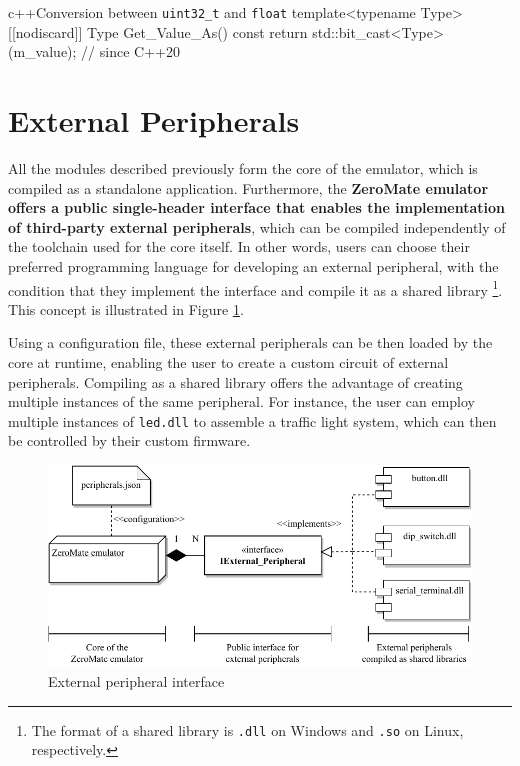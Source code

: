 \documentclass[english, ing, kiv, he, iso690numb, pdf]{fasthesis}
\begin{document}
\begin{code}{c++}{Conversion between \texttt{uint32\_t} and \texttt{float}\label{Conversion between uint32_t and float}}
template<typename Type>
[[nodiscard]] Type Get_Value_As() const
{
	return std::bit_cast<Type>(m_value); // since C++20
}
\end{code}
	
	\newpage
	
	\section{External Peripherals} \label{External 
		Peripherals}
	
	All the modules described previously form the core of the emulator, which is compiled as a standalone application. Furthermore, the \textbf{ZeroMate emulator offers a public single-header interface that enables the implementation of third-party external peripherals}, which can be compiled independently of the toolchain used for the core itself. In other words, users can choose their preferred programming language for developing an external peripheral, with the condition that they implement the interface and compile it as a shared library \footnote{The format of a shared library is \texttt{.dll} on Windows and \texttt{.so} on Linux, respectively.}. This concept is illustrated in Figure \ref{External peripheral interface}.
	
	Using a configuration file, these external peripherals can be then loaded by the core at runtime, enabling the user to create a custom circuit of external peripherals. Compiling as a shared library offers the advantage of creating multiple instances of the same peripheral. For instance, the user can employ multiple instances of \texttt{led.dll} to assemble a traffic light system, which can then be controlled by their custom firmware.
	
	\begin{figure}[ht]
		\centering
		\includegraphics[width=1.0\textwidth]{img/diagrams/external_peripherals.pdf}
		\caption{External peripheral interface}
		\label{External peripheral interface}
	\end{figure}
	
\end{document}
